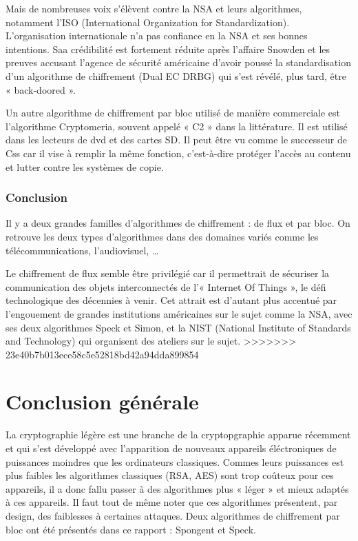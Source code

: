 			Mais de nombreuses voix s'élèvent contre la NSA et leurs algorithmes, notamment l'ISO (International Organization for Standardization).
			L'organisation internationale n'a pas confiance en la NSA et ses bonnes intentions.
			Saa crédibilité est fortement réduite après l'affaire Snowden et les preuves accusant l'agence de sécurité américaine d'avoir poussé la standardisation d'un algorithme de chiffrement (Dual EC DRBG) qui s'est révélé, plus tard, être « back-doored »\cite{NSABackdoor}.
			
			Un autre algorithme de chiffrement par bloc utilisé de manière commerciale est l'algorithme Cryptomeria, souvent appelé « C2 » dans la littérature.
			Il est utilisé dans les lecteurs de dvd et des cartes SD. Il peut être vu comme le successeur de Css car il vise à remplir la même fonction, c'est-à-dire protéger l'accès au contenu et lutter contre les systèmes de copie.
			
			\section{Conclusion}
			
			Il y a deux grandes familles d'algorithmes de chiffrement : de flux et par bloc.
			On retrouve les deux types d'algorithmes dans des domaines variés comme les télécommunications, l'audiovisuel, \dots
			
			Le chiffrement de flux semble être privilégié car il permettrait de sécuriser la communication des objets interconnectés de l'« Internet Of Things », le défi technologique des décennies à venir.
			Cet attrait est d'autant plus accentué par l'engouement de grandes institutions américaines sur le sujet comme la NSA, avec ses deux algorithmes Speck et Simon, et la NIST (National Institute of Standards and Technology) qui organisent des ateliers sur le sujet.
>>>>>>> 23e40b7b013ece58c5e52818bd42a94dda899854

	
\newpage
\part*{Conclusion générale}

La cryptographie légère est une branche de la cryptopgraphie apparue récemment et qui s'est développé avec l'apparition de nouveaux appareils éléctroniques de puissances moindres que les ordinateurs classiques.
Commes leurs puissances est plus faibles les algorithmes classiques (RSA, AES) sont trop coûteux pour ces appareils, il a donc fallu passer à des algorithmes plus « léger » et mieux adaptés à ces appareils.
Il faut tout de même noter que ces algorithmes présentent, par design, des faiblesses à certaines attaques.
Deux algorithmes de chiffrement par bloc ont été présentés dans ce rapport : Spongent et Speck.

